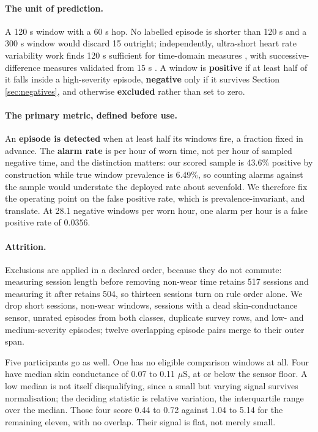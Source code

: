 \paragraph{The unit of prediction.} A 120 s window with a 60 s hop. No labelled
episode is shorter than 120 s and a 300 s window would discard 15 outright;
independently, ultra-short heart rate variability work finds 120 s sufficient
for time-domain measures \cite{munoz2015}, with successive-difference measures
validated from 15 s \cite{orini2023}. A window is \textbf{positive} if at least
half of it falls inside a high-severity episode, \textbf{negative} only if it
survives Section \ref{sec:negatives}, and otherwise \textbf{excluded} rather
than set to zero.

\paragraph{The primary metric, defined before use.} An \textbf{episode is
detected} when at least half its windows fire, a fraction fixed in advance. The
\textbf{alarm rate} is per hour of worn time, not per hour of sampled negative
time, and the distinction matters: our scored sample is 43.6\% positive by
construction while true window prevalence is 6.49\%, so counting alarms against
the sample would understate the deployed rate about sevenfold. We therefore fix
the operating point on the false positive rate, which is prevalence-invariant,
and translate. At 28.1 negative windows per worn hour, one alarm per hour is a
false positive rate of $0.0356$.

\paragraph{Attrition.} Exclusions are applied in a declared order, because they
do not commute: measuring session length before removing non-wear time retains
517 sessions and measuring it after retains 504, so thirteen sessions turn on
rule order alone. We drop short sessions, non-wear windows, sessions with a
dead skin-conductance sensor, unrated episodes from both classes, duplicate
survey rows, and low- and medium-severity episodes; twelve overlapping episode
pairs merge to their outer span.

Five participants go as well. One has no eligible comparison windows at all.
Four have median skin conductance of 0.07 to 0.11 $\mu$S, at or below the
sensor floor. A low median is not itself disqualifying, since a small but
varying signal survives normalisation; the deciding statistic is relative
variation, the interquartile range over the median. Those four score 0.44 to
0.72 against 1.04 to 5.14 for the remaining eleven, with no overlap. Their
signal is flat, not merely small.

